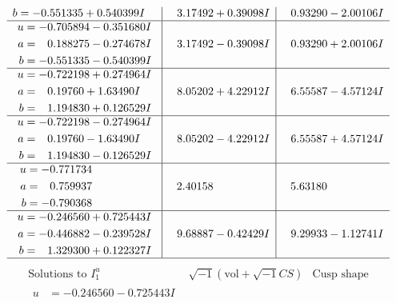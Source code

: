 \documentclass[1p]{elsarticle_modified}
\theoremstyle{definition}
\newcommand{\I}{\sqrt{-1}}
\begin{document}
$$\begin{array}{c|c|c}
\begin{aligned}
b &= -0.551335 + 0.540399 I\end{aligned}
 & \phantom{-}3.17492 + 0.39098 I & \phantom{-}0.93290 - 2.00106 I \\ \hline\begin{aligned}
u &= -0.705894 - 0.351680 I \\
a &= \phantom{-}0.188275 - 0.274678 I \\
b &= -0.551335 - 0.540399 I\end{aligned}
 & \phantom{-}3.17492 - 0.39098 I & \phantom{-}0.93290 + 2.00106 I \\ \hline\begin{aligned}
u &= -0.722198 + 0.274964 I \\
a &= \phantom{-}0.19760 + 1.63490 I \\
b &= \phantom{-}1.194830 + 0.126529 I\end{aligned}
 & \phantom{-}8.05202 + 4.22912 I & \phantom{-}6.55587 - 4.57124 I \\ \hline\begin{aligned}
u &= -0.722198 - 0.274964 I \\
a &= \phantom{-}0.19760 - 1.63490 I \\
b &= \phantom{-}1.194830 - 0.126529 I\end{aligned}
 & \phantom{-}8.05202 - 4.22912 I & \phantom{-}6.55587 + 4.57124 I \\ \hline\begin{aligned}
u &= -0.771734\phantom{ +0.000000I} \\
a &= \phantom{-}0.759937\phantom{ +0.000000I} \\
b &= -0.790368\phantom{ +0.000000I}\end{aligned}
 & \phantom{-}2.40158\phantom{ +0.000000I} & \phantom{-}5.63180\phantom{ +0.000000I} \\ \hline\begin{aligned}
u &= -0.246560 + 0.725443 I \\
a &= -0.446882 - 0.239528 I \\
b &= \phantom{-}1.329300 + 0.122327 I\end{aligned}
 & \phantom{-}9.68887 - 0.42429 I & \phantom{-}9.29933 - 1.12741 I\\
 \hline 
 \end{array}$$\newpage$$\begin{array}{c|c|c}  
\text{Solutions to }I^u_{1}& \I (\text{vol} + \sqrt{-1}CS) & \text{Cusp shape}\\
 \hline 
\begin{aligned}
u &= -0.246560 - 0.725443 I \\

\end{aligned}
\end{array}$$
\end{document}
